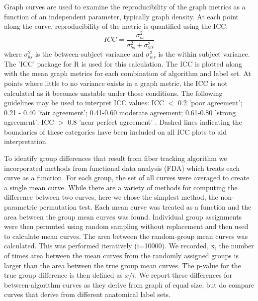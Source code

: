 \documentclass{frontiersSCNS} %
\newcommand{\R}{R}
\begin{document}
Graph curves are used to examine the reproducibility of the graph metrics as a function of an independent parameter, typically graph density. At each point along the curve, reproducibility of the metric is quantified using the ICC:
$$ICC = \frac{\sigma_{bs}^{2}}{\sigma_{bs}^{2} + \sigma_{ws}^{2}} $$
where $\sigma_{bs}^{2}$ is the between-subject variance and $\sigma_{ws}^{2}$ is the within subject variance. The 'ICC' package for  \R{} is used for this calculation. The ICC is plotted along with the mean graph metrics for each combination of algorithm and label set. At points where little to no variance exists in a graph metric, the ICC is not calculated as it becomes unstable under those conditions. The following guidelines may be used to interpret ICC values: ICC $<$ 0.2 'poor agreement'; 0.21 - 0.40 'fair agreement'; 0.41-0.60 moderate agreement; 0.61-0.80 'strong agreement'; ICC $>$ 0.8 'near perfect agreement' \citep{Telesford2010,Montgomery2002}. Dashed lines indicating the boundaries of these categories have been included on all ICC plots to aid interpretation.

To identify group differences that result from fiber tracking algorithm we incorporated methods from functional data analysis (FDA) which treats each curve as a function. For each group, the set of all curves were averaged to create a single mean curve.  While there are a variety of methods for computing the difference between two curves, here we chose the simplest method, the non-parametric permutation test. Each mean curve was treated as a function and the area between the group mean curves was found. Individual group assignments were then permuted using random sampling without replacement and then  used to calculate mean curves. The area between the random-group mean curves was calculated. This was performed iteratively (i=10000). We recorded, x, the number of times area between the mean curves from the randomly assigned groups is larger than the area between the true group mean curves. The p-value for the true group difference is then defined as $x/i$. We report these differences for between-algorithm curves as they derive from graph of equal size, but do compare curves that derive from different anatomical label sets.

\end{document}
